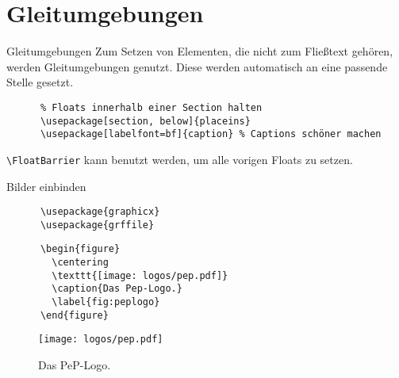 \section{Gleitumgebungen}

\begin{frame}[fragile]{Gleitumgebungen}
  Zum Setzen von Elementen, die nicht zum Fließtext gehören, werden Gleitumgebungen genutzt.
  Diese werden automatisch an eine passende Stelle gesetzt.

  \begin{Packages}
    \begin{lstlisting}
      % Floats innerhalb einer Section halten
      \usepackage[section, below]{placeins}
      \usepackage[labelfont=bf]{caption} % Captions schöner machen
    \end{lstlisting}
  \end{Packages}

  \lstinline+\FloatBarrier+ kann benutzt werden, um alle vorigen Floats zu setzen.
\end{frame}

\begin{frame}[fragile]{Bilder einbinden}
  \begin{Packages}
    \begin{lstlisting}
      \usepackage{graphicx}
      \usepackage{grffile}
    \end{lstlisting}
  \end{Packages}
  \begin{CodeExample}{0.60}
    \begin{lstlisting}
      \begin{figure}
        \centering
        \texttt{[image: logos/pep.pdf]}
        \caption{Das Pep-Logo.}
        \label{fig:peplogo}
      \end{figure} 
    \end{lstlisting}
  \CodeResult
    \begin{figure}
      \centering
      \texttt{[image: logos/pep.pdf]}
      \caption{Das PeP-Logo.}
      \label{fig:peplogo}
    \end{figure}
  \end{CodeExample}
\end{frame}

